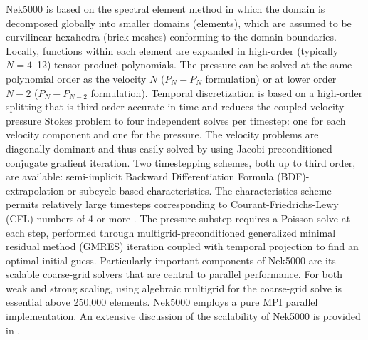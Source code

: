 Nek5000 is based on the spectral element method \cite{patera1984} in which  the
domain is decomposed globally into smaller domains (elements), which are
assumed to be curvilinear hexahedra (brick meshes) conforming to the domain
boundaries. Locally, functions within each element are expanded in high-order
(typically $N=4$--12) tensor-product polynomials.  The pressure can be solved
at the same polynomial order as the velocity $N$ ($P_{N} - P_{N}$ formulation)
or at lower order $N-2$ ($P_{N} - P_{N-2}$ formulation).  Temporal
discretization is based on a high-order splitting that is third-order accurate
in time and reduces the coupled velocity-pressure Stokes problem to four
independent solves per timestep: one for each velocity component and one for
the pressure. The velocity problems are diagonally dominant and thus easily
solved by using Jacobi preconditioned conjugate gradient iteration. Two
timestepping schemes, both up to third order, are available: semi-implicit
Backward Differentiation Formula (BDF)-extrapolation or subcycle-based characteristics. The characteristics
scheme permits relatively large timesteps corresponding to Courant-Friedrichs-Lewy (CFL) numbers
of 4 or more \cite{patel19}. The pressure substep requires a Poisson solve
at each step, performed through multigrid-preconditioned generalized minimal residual method (GMRES) iteration
coupled with temporal projection to find an optimal initial guess.
Particularly important components of Nek5000 are its scalable coarse-grid
solvers that are central to parallel performance. For both weak and
strong scaling, using algebraic multigrid for the coarse-grid solve is
essential above 250,000 elements. Nek5000 employs a pure MPI parallel
implementation.  An extensive discussion of the scalability of Nek5000 is
provided in \cite{fischer15,fischer20a}.

